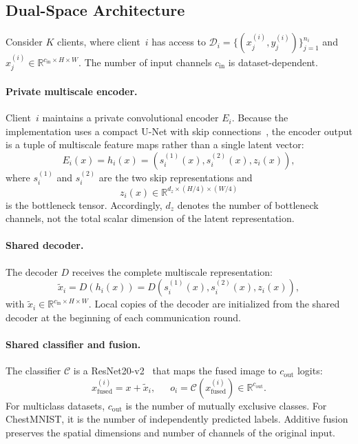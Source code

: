 \documentclass[twoside]{article}
\theoremstyle{thmstyleone}%
\theoremstyle{thmstyletwo}%
\theoremstyle{thmstylethree}%
\begin{document}
\subsection{Dual-Space Architecture}

Consider $K$ clients, where client~$i$ has access to
$\mathcal{D}_i=\{(x_j^{(i)},y_j^{(i)})\}_{j=1}^{n_i}$ and
$x_j^{(i)}\in\mathbb{R}^{c_{\mathrm{in}}\times H\times W}$. The number of
input channels $c_{\mathrm{in}}$ is dataset-dependent.

\paragraph{Private multiscale encoder.}
Client~$i$ maintains a private convolutional encoder $E_i$. Because the
implementation uses a compact U-Net with skip connections~\cite{ronneberger2015unet}, the encoder output
is a tuple of multiscale feature maps rather than a single latent vector:
\begin{equation*}
E_i(x)
=
h_i(x)
=
\left(s_i^{(1)}(x),s_i^{(2)}(x),z_i(x)\right),
\end{equation*}
where $s_i^{(1)}$ and $s_i^{(2)}$ are the two skip representations and
\begin{equation*}
z_i(x)\in
\mathbb{R}^{d_z\times (H/4)\times(W/4)}
\end{equation*}
is the bottleneck tensor. Accordingly, $d_z$ denotes the number of bottleneck
channels, not the total scalar dimension of the latent representation.

\paragraph{Shared decoder.}
The decoder $D$ receives the complete multiscale representation:
\begin{equation*}
\tilde{x}_i
=
D\!\left(h_i(x)\right)
=
D\!\left(s_i^{(1)}(x),s_i^{(2)}(x),z_i(x)\right),
\end{equation*}
with $\tilde{x}_i\in\mathbb{R}^{c_{\mathrm{in}}\times H\times W}$. Local
copies of the decoder are initialized from the shared decoder at the beginning
of each communication round.

\paragraph{Shared classifier and fusion.}
The classifier $\mathcal{C}$ is a ResNet20-v2~\cite{he2016identity} that maps the fused image to
$c_{\mathrm{out}}$ logits:
\begin{equation*}
x_{\mathrm{fused}}^{(i)}
=
x+\tilde{x}_i, \,\,\,\,\,\,\,\,\,
o_i
=
\mathcal{C}\!\left(x_{\mathrm{fused}}^{(i)}\right)
\in\mathbb{R}^{c_{\mathrm{out}}}.
\end{equation*}
For multiclass datasets, $c_{\mathrm{out}}$ is the number of mutually
exclusive classes. For ChestMNIST, it is the number of independently predicted
labels. Additive fusion preserves the spatial dimensions and number of channels
of the original input.
\end{document}
